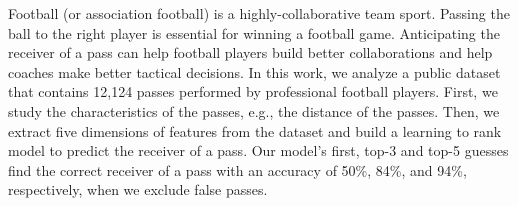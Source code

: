 Football (or association football) is a highly-collaborative team sport. 
Passing the ball to the right player is essential for winning a football game.
Anticipating the receiver of a pass can help football players build better collaborations and help coaches make better tactical decisions.
In this work, we analyze a public dataset that contains 12,124 passes performed by professional football players.
First, we study the characteristics of the passes, e.g., the distance of the passes.
Then, we extract five dimensions of features from the dataset and build a learning to rank model to predict the receiver of a pass. 
Our model's first, top-3 and top-5 guesses find the correct receiver of a pass with an accuracy of 50\%, 84\%, and 94\%, respectively, when we exclude false passes.